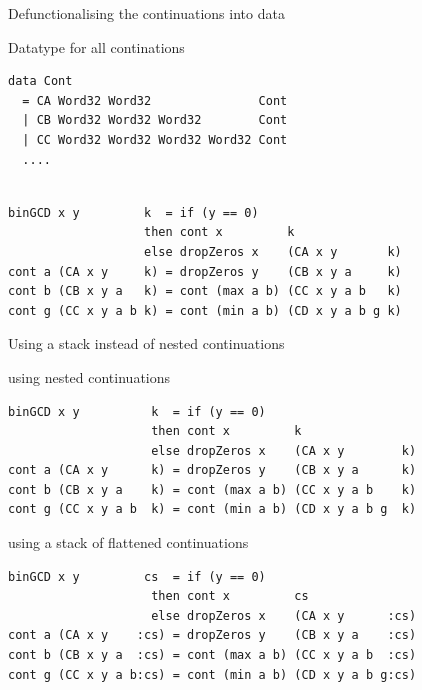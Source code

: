 \documentclass[pdf]{beamer}
\begin{document}
\begin{frame}[fragile]{Defunctionalising the continuations into data}
\begin{block}{Datatype for all continations}  %
\begin{verbatim}
data Cont
  = CA Word32 Word32               Cont
  | CB Word32 Word32 Word32        Cont
  | CC Word32 Word32 Word32 Word32 Cont
  ....
\end{verbatim}
\end{block}
\pause
\begin{block}{}
\begin{small}
\begin{verbatim}

binGCD x y         k  = if (y == 0)
                   then cont x         k
                   else dropZeros x    (CA x y       k)
cont a (CA x y     k) = dropZeros y    (CB x y a     k)
cont b (CB x y a   k) = cont (max a b) (CC x y a b   k)
cont g (CC x y a b k) = cont (min a b) (CD x y a b g k)
\end{verbatim}
\end{small}
\end{block}

\end{frame}


\begin{frame}[fragile]{Using a stack instead of nested continuations}
\begin{small}
\begin{block}{using nested continuations}
\begin{verbatim}
binGCD x y          k  = if (y == 0)
                    then cont x         k
                    else dropZeros x    (CA x y        k)
cont a (CA x y      k) = dropZeros y    (CB x y a      k)
cont b (CB x y a    k) = cont (max a b) (CC x y a b    k)
cont g (CC x y a b  k) = cont (min a b) (CD x y a b g  k)
\end{verbatim}
\end{block}
\begin{block}{using a stack of flattened continuations}
\begin{verbatim}
binGCD x y         cs  = if (y == 0)
                    then cont x         cs
                    else dropZeros x    (CA x y      :cs)
cont a (CA x y    :cs) = dropZeros y    (CB x y a    :cs)
cont b (CB x y a  :cs) = cont (max a b) (CC x y a b  :cs)
cont g (CC x y a b:cs) = cont (min a b) (CD x y a b g:cs)
\end{verbatim}
\end{block}
\end{small}
\end{frame}
\end{document}
